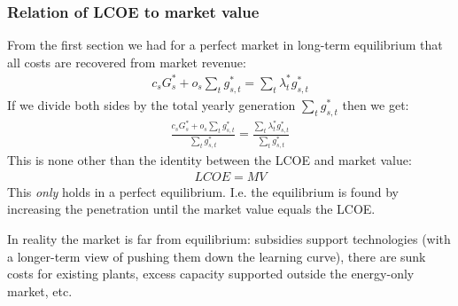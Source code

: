 \documentclass[10pt,dvipsnames]{beamer}
\def\l{\lambda}
\begin{document}
\begin{frame}
  \frametitle{Relation of LCOE to market value}

  From the first section we had for a perfect market in long-term equilibrium that all costs are recovered from market revenue:
  \begin{align*}
    c_s G_s^* +  o_{s} \sum_{t}  g_{s,t}^* =  \sum_{t} \l_t^* g_{s,t}^*
  \end{align*}
  If we divide both sides by the total yearly generation $\sum_{t} g_{s,t}^*$ then we get:
  \begin{align*}
    \frac{c_s G_s^* +  o_{s} \sum_{t}  g_{s,t}^*}{\sum_{t} g_{s,t}^*} =  \frac{\sum_{t} \l_t^* g_{s,t}^*}{\sum_{t} g_{s,t}^*}
  \end{align*}
  This is none other than the identity between the LCOE and market value:
  \begin{align*}
    LCOE = MV
  \end{align*}
  This \emph{only} holds in a perfect equilibrium. I.e. the
  equilibrium is found by increasing the penetration until the market
  value equals the LCOE.

  In reality the market is far from equilibrium: subsidies support
  technologies (with a longer-term view of pushing them down the
  learning curve), there are sunk costs for existing plants, excess
  capacity supported outside the energy-only market, etc.
\end{frame}
\end{document}
